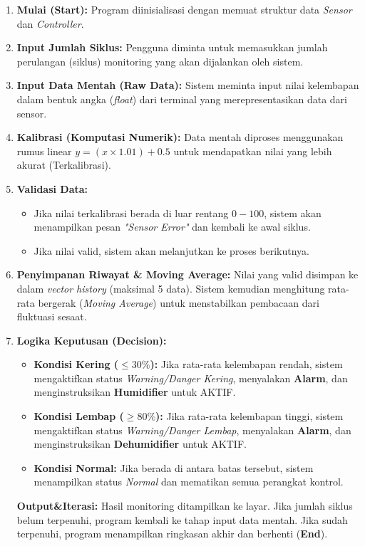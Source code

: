 \documentclass[12pt,a4paper]{article}
\begin{document}
\begin{enumerate}
    \item \textbf{Mulai (Start):} Program diinisialisasi dengan memuat struktur data \textit{Sensor} dan \textit{Controller}.
    \item \textbf{Input Jumlah Siklus:} Pengguna diminta untuk memasukkan jumlah perulangan (siklus) monitoring yang akan dijalankan oleh sistem.
    \item \textbf{Input Data Mentah (Raw Data):} Sistem meminta input nilai kelembapan dalam bentuk angka (\textit{float}) dari terminal yang merepresentasikan data dari sensor.
    \item \textbf{Kalibrasi (Komputasi Numerik):} Data mentah diproses menggunakan rumus linear $y = (x \times 1.01) + 0.5$ untuk mendapatkan nilai yang lebih akurat (Terkalibrasi).
    \item \textbf{Validasi Data:} 
    \begin{itemize}
        \item Jika nilai terkalibrasi berada di luar rentang $0 - 100$, sistem akan menampilkan pesan \textit{"Sensor Error"} dan kembali ke awal siklus.
        \item Jika nilai valid, sistem akan melanjutkan ke proses berikutnya.
    \end{itemize}
    \item \textbf{Penyimpanan Riwayat \& Moving Average:} Nilai yang valid disimpan ke dalam \textit{vector history} (maksimal 5 data). Sistem kemudian menghitung rata-rata bergerak (\textit{Moving Average}) untuk menstabilkan pembacaan dari fluktuasi sesaat.
    \item \textbf{Logika Keputusan (Decision):}
    \begin{itemize}
        \item \textbf{Kondisi Kering ($\le 30\%$):} Jika rata-rata kelembapan rendah, sistem mengaktifkan status \textit{Warning/Danger Kering}, menyalakan \textbf{Alarm}, dan menginstruksikan \textbf{Humidifier} untuk AKTIF.
        \item \textbf{Kondisi Lembap ($\ge 80\%$):} Jika rata-rata kelembapan tinggi, sistem mengaktifkan status \textit{Warning/Danger Lembap}, menyalakan \textbf{Alarm}, dan menginstruksikan \textbf{Dehumidifier} untuk AKTIF.
        \item \textbf{Kondisi Normal:} Jika berada di antara batas tersebut, sistem menampilkan status \textit{Normal} dan mematikan semua perangkat kontrol.
    \end{itemize}
    \textbf{Output&Iterasi:}
    Hasil monitoring ditampilkan ke layar. Jika jumlah siklus belum terpenuhi, program kembali ke tahap input data mentah. Jika sudah terpenuhi, program menampilkan ringkasan akhir dan berhenti 
    (\textbf{End}).
\end{enumerate}
\end{document}
